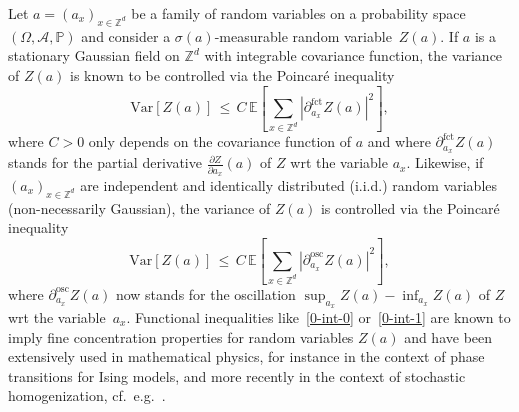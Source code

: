 \documentclass[10pt]{amsart}
\theoremstyle{definition}\newtheorem{defi}[theo]{Definition}\newtheorem{rema}[theo]{Remark}\newtheorem{exam}[theo]{Example}\newtheorem{exem}[theo]{Example}\newtheorem{nota}[theo]{Notation}
\newcommand{\Z}{\mathbb Z}
\newcommand{\p}{\mathbb{P}}
\newcommand{\E}{\mathbb{E}}
\newcommand{\A}{\mathcal A}
\newcommand{\parfct}[1]{\partial_{#1}^{\operatorname{fct}}}
\newcommand{\osc}{\partial^{\mathrm{osc}}}
\newcommand{\var}[1]{\mathrm{Var}\left[#1\right]}
\begin{document}
Let $a=(a_x)_{x\in \Z^d}$ be a family of random variables on a probability space $(\Omega,\A,\p)$ and consider a $\sigma(a)$-measurable random variable~$Z(a)$. If $a$ is a stationary Gaussian field on $\Z^d$ with integrable covariance function, the variance of $Z(a)$ is known to be controlled via the Poincaré inequality
\begin{equation}\label{0-int-0}
\var{Z(a)} \,\le \,C\,\E\left[{\sum_{x\in \Z^d} |\parfct{a_x} Z(a)|^2}\right],
\end{equation}
where $C>0$ only depends on the covariance function of $a$ and where $\parfct{a_x} Z(a)$ stands for the partial derivative $\frac{\partial Z}{\partial a_x}(a)$ of $Z$ wrt the variable $a_x$. Likewise, if $(a_x)_{x\in \Z^d}$ are independent and identically distributed (i.i.d.) random variables (non-necessarily Gaussian), the variance of $Z(a)$ is controlled via the Poincaré inequality
\begin{equation}\label{0-int-1}
\var{Z(a)} \,\le \,C\,\E\left[{ \sum_{x\in \Z^d} |\osc_{a_x} Z(a)|^2}\right],
\end{equation}
where $\osc_{a_x} Z(a)$ now stands for the oscillation $\sup_{a_x} Z(a)-\inf_{a_x} Z(a)$ of $Z$ wrt the variable~$a_x$. Functional inequalities like~\eqref{0-int-0} or~\eqref{0-int-1} are known to imply fine concentration properties for random variables $Z(a)$ and have been extensively used in mathematical physics, for instance in the context of phase transitions for Ising models, and more recently in the context of stochastic homogenization, cf.~e.g.~\cite{DGO1,Glotto-Neukamm-14,GNO-I,Glotto-11,Glotto-12,Marahrens-Otto-15,Naddaf-Spencer-98}.

\end{document}
